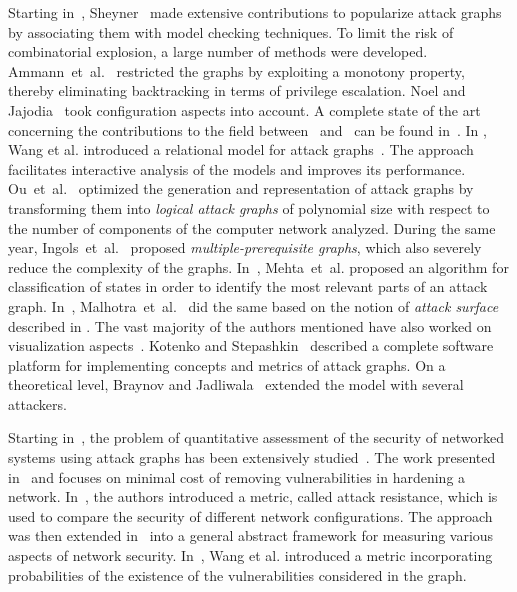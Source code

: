 \documentclass[a4paper]{article}
\begin{document}
Starting in~, Sheyner~\cite{ShHaJhLiWi,Shey} made extensive  contributions
 to popularize attack graphs by associating them with model checking techniques.
To limit the risk of combinatorial explosion, a large number of methods were 
developed. Ammann~et~al.~\cite{AmWiKa} restricted the graphs by exploiting a 
monotony property, thereby eliminating backtracking in terms of privilege 
escalation. Noel and Jajodia~\cite{NoJaObJa,JaNoOb} took configuration aspects 
into account.  A complete state of the art  concerning the contributions to the
field between~ and~ can be  found in~\cite{LiIn}. In , Wang et
al. introduced a relational model for attack  graphs~\cite{WaYaSiJa}.  The
approach facilitates interactive analysis of the models and improves its 
performance.  Ou~et~al.~\cite{OuBoQu} optimized the  generation and
representation of attack graphs by transforming them into  \emph{logical attack
graphs} of polynomial size with respect to the number of  components of the
computer network analyzed.  During the same year,  Ingols~et~al.~\cite{InLiPi}
proposed \emph{multiple-prerequisite graphs}, which  also severely reduce the
complexity of the graphs.   In~\cite{MeBaZhClWi}, Mehta~et~al. proposed an
algorithm  for classification of states in order to identify the most relevant 
parts of an attack graph. In~, Malhotra~et~al.~\cite{MaBaGh} did the same
based on the notion of \emph{attack surface} described in \cite{Mana}. The vast 
majority of the authors mentioned have also worked on visualization 
aspects~\cite{NoJa,NoJaKaJa,WiLiIn,HoVaOuQu}. Kotenko and 
Stepashkin~\cite{KoSt} described a complete software platform for implementing 
concepts and metrics of attack graphs. On a theoretical level, Braynov and 
Jadliwala~\cite{BrJa} extended the model with several attackers.

Starting in~, the problem of quantitative  assessment of the security of
networked systems using attack  graphs has been extensively 
studied~\cite{NoJaObJa,WaNoJa,WaSiJa2,WaSiJa,WaIsLoSiJa}.  The work presented
in~\cite{NoJaObJa} and \cite{WaNoJa}  focuses on minimal cost of removing
vulnerabilities in hardening a network.  In~\cite{WaSiJa2}, the authors
introduced a metric, called attack resistance, which is used to compare the
security of different network configurations.   The approach was then extended
in~\cite{WaSiJa} into a general abstract framework  for measuring various
aspects of network security.  In~\cite{WaIsLoSiJa}, Wang et al. introduced a
metric incorporating probabilities  of the existence of the vulnerabilities
considered in the graph.
\end{document}
